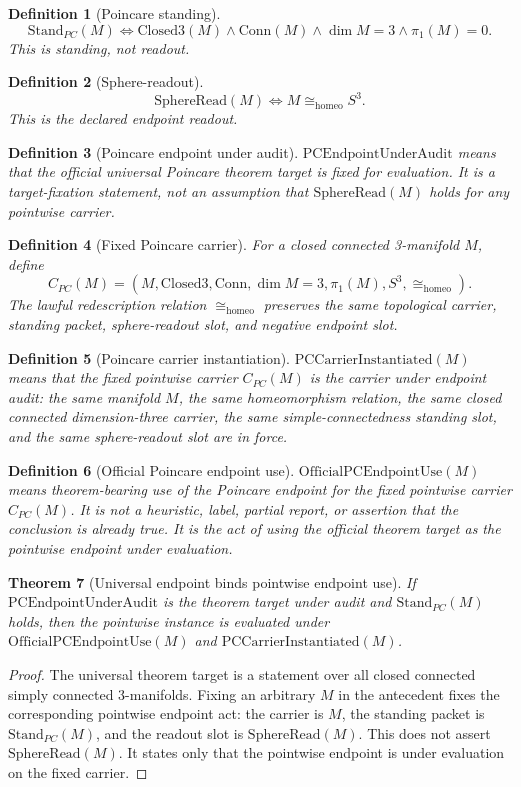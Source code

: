 \documentclass[11pt]{article}
\newtheorem{theorem}{Theorem}[section]
\newtheorem{definition}[theorem]{Definition}
\newcommand{\Sthree}{S^{3}}
\newcommand{\ClosedThree}{\mathrm{Closed3}}
\newcommand{\Conn}{\mathrm{Conn}}
\newcommand{\StandPC}{\mathrm{Stand}_{PC}}
\newcommand{\SphereRead}{\mathrm{SphereRead}}
\newcommand{\CarrierPC}{C_{PC}}
\newcommand{\PCEndpoint}{\mathrm{PCEndpointUnderAudit}}
\newcommand{\OfficialPCEndpointUse}{\mathrm{OfficialPCEndpointUse}}
\newcommand{\PCCarrierInst}{\mathrm{PCCarrierInstantiated}}
\newcommand{\Homeo}{\cong_{\mathrm{homeo}}}
\begin{document}
\begin{definition}[Poincare standing]
\[
\StandPC(M)\Longleftrightarrow \ClosedThree(M)\wedge\Conn(M)\wedge \dim M=3\wedge \pi_1(M)=0.
\]
This is standing, not readout.
\end{definition}

\begin{definition}[Sphere-readout]
\[
\SphereRead(M)\Longleftrightarrow M\Homeo\Sthree.
\]
This is the declared endpoint readout.
\end{definition}

\begin{definition}[Poincare endpoint under audit]
\(\PCEndpoint\) means that the official universal Poincare theorem target is fixed for evaluation. It is a target-fixation statement, not an assumption that \(\SphereRead(M)\) holds for any pointwise carrier.
\end{definition}

\begin{definition}[Fixed Poincare carrier]
For a closed connected 3-manifold \(M\), define
\[
\CarrierPC(M)=(M,\ClosedThree,\Conn,\dim M=3,\pi_1(M),\Sthree,\Homeo).
\]
The lawful redescription relation \(\Homeo\) preserves the same topological carrier, standing packet, sphere-readout slot, and negative endpoint slot.
\end{definition}

\begin{definition}[Poincare carrier instantiation]
\(\PCCarrierInst(M)\) means that the fixed pointwise carrier \(\CarrierPC(M)\) is the carrier under endpoint audit: the same manifold \(M\), the same homeomorphism relation, the same closed connected dimension-three carrier, the same simple-connectedness standing slot, and the same sphere-readout slot are in force.
\end{definition}

\begin{definition}[Official Poincare endpoint use]
\(\OfficialPCEndpointUse(M)\) means theorem-bearing use of the Poincare endpoint for the fixed pointwise carrier \(\CarrierPC(M)\). It is not a heuristic, label, partial report, or assertion that the conclusion is already true. It is the act of using the official theorem target as the pointwise endpoint under evaluation.
\end{definition}

\begin{theorem}[Universal endpoint binds pointwise endpoint use]\label{thm:universal-binds-pointwise}
If \(\PCEndpoint\) is the theorem target under audit and \(\StandPC(M)\) holds, then the pointwise instance is evaluated under \(\OfficialPCEndpointUse(M)\) and \(\PCCarrierInst(M)\).
\end{theorem}
\begin{proof}
The universal theorem target is a statement over all closed connected simply connected 3-manifolds. Fixing an arbitrary \(M\) in the antecedent fixes the corresponding pointwise endpoint act: the carrier is \(M\), the standing packet is \(\StandPC(M)\), and the readout slot is \(\SphereRead(M)\). This does not assert \(\SphereRead(M)\). It states only that the pointwise endpoint is under evaluation on the fixed carrier.
\end{proof}
\end{document}

